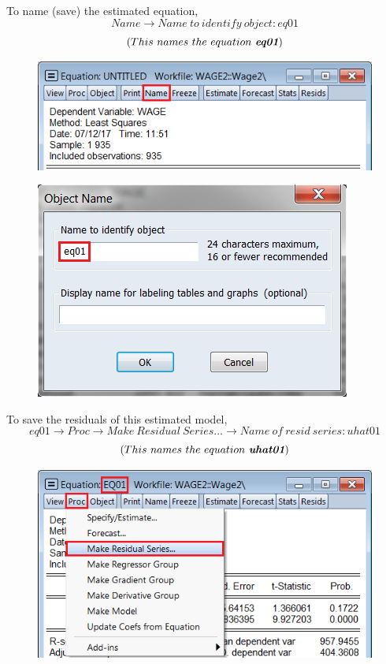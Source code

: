 \documentclass[12pt]{report}
\begin{document}
\vspace{-\baselineskip}
\noindent To name (save) the estimated equation,
$$Name \to Name\ to\ identify\ object: eq01$$
$$(This\ names\ the\ equation\ \textit{\textbf{eq01}})$$
\begin{figure}[H]
	\centering
	\includegraphics{q3_14}
\end{figure}
\vspace{-\baselineskip}
\begin{figure}[H]
	\centering
	\includegraphics{q3_15}
\end{figure}
\vspace{-\baselineskip}
\noindent To save the residuals of this estimated model,
$$eq01 \to Proc \to Make\ Residual\ Series \dots \to Name\ of\ resid\ series: uhat01$$
$$(This\ names\ the\ equation\ \textit{\textbf{uhat01}})$$
\begin{figure}[H]
	\centering
	\includegraphics{q3_16}
\end{figure}
\end{document}
